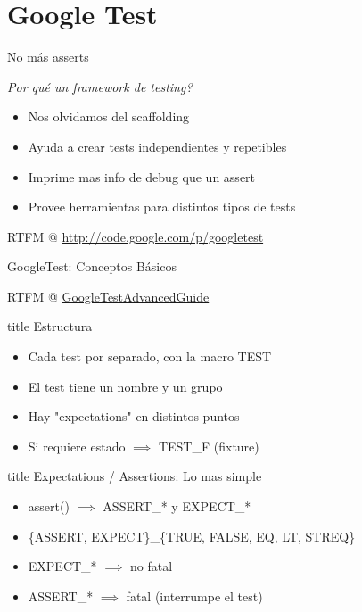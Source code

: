 \section{Google Test}

\begin{frame}[t]{No m\'as asserts}
\begin{center}
\end{center}
\textit{ \textquestiondown Por qu\'e un framework de testing? }
\bigskip
\begin{itemize}
	\item Nos olvidamos del scaffolding
	\item Ayuda a crear tests independientes y repetibles
	\item Imprime mas info de debug que un assert
	\item Provee herramientas para distintos tipos de tests
\end{itemize}
\bigskip
RTFM @ \url{http://code.google.com/p/googletest}
\end{frame}

\begin{frame}[t]{GoogleTest: Conceptos B\'asicos}
\begin{flushright}
	RTFM @ \href{http://code.google.com/p/googletest/wiki/GoogleTestAdvancedGuide}{GoogleTestAdvancedGuide}
\end{flushright}
\begin{beamercolorbox}[sep=.1cm,shadow=true,rounded=true,center]{title}
	Estructura 
\end{beamercolorbox}
\begin{itemize}
	\item Cada test por separado, con la macro TEST
	\item El test tiene un nombre y un grupo
	\item Hay "expectations" en distintos puntos
	\item Si requiere estado $\implies$ TEST\_F (fixture)
\end{itemize}
\bigskip
\begin{beamercolorbox}[sep=.1cm,shadow=true,rounded=true,center]{title}
	Expectations / Assertions: Lo mas simple
\end{beamercolorbox}
\begin{itemize}
	\item assert() $\implies$ ASSERT\_* y EXPECT\_*
	\item \{ASSERT, EXPECT\}\_\{TRUE, FALSE, EQ, LT, STREQ\}
	\item EXPECT\_* $\implies$ no fatal
	\item ASSERT\_* $\implies$ fatal (interrumpe el test)
\end{itemize}
\bigskip
\end{frame}



